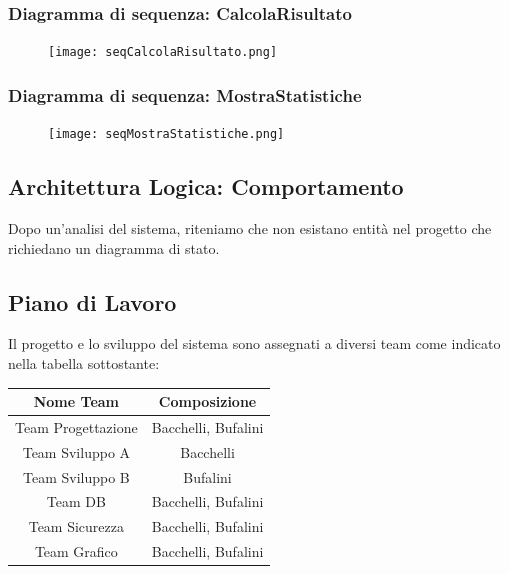 \documentclass[a4paper, 11pt]{article}
\begin{document}
\clearpage
\newpage
\subsubsection*{Diagramma di sequenza: CalcolaRisultato}
\begin{figure}[h!]
    \centering
    \texttt{[image: seqCalcolaRisultato.png]}
    \label{fig:calcolaRisultato}
\end{figure}
\newpage
\clearpage
\subsubsection*{Diagramma di sequenza: MostraStatistiche}
\begin{figure}[h!]
    \centering
    \texttt{[image: seqMostraStatistiche.png]}
    \label{fig:mostraStatistiche}
\end{figure}
\subsection{Architettura Logica: Comportamento}
Dopo un’analisi del sistema, riteniamo che non esistano entità nel progetto che richiedano un diagramma di stato.

\clearpage
\newpage
\subsection{Piano di Lavoro}
Il progetto e lo sviluppo del sistema sono assegnati a diversi team come indicato nella tabella sottostante:
\begin{center}
    \begin{tabular}{|c|c|}
        \hline
        \textbf{Nome Team} & \textbf{Composizione} \\\hline
        Team Progettazione & Bacchelli, Bufalini \\\hline
        Team Sviluppo A & Bacchelli \\\hline
        Team Sviluppo B & Bufalini \\\hline
        Team DB & Bacchelli, Bufalini \\\hline
        Team Sicurezza & Bacchelli, Bufalini \\\hline
        Team Grafico & Bacchelli, Bufalini \\
        \hline 
    \end{tabular}
\end{center}

\vspace{2em}
\end{document}
